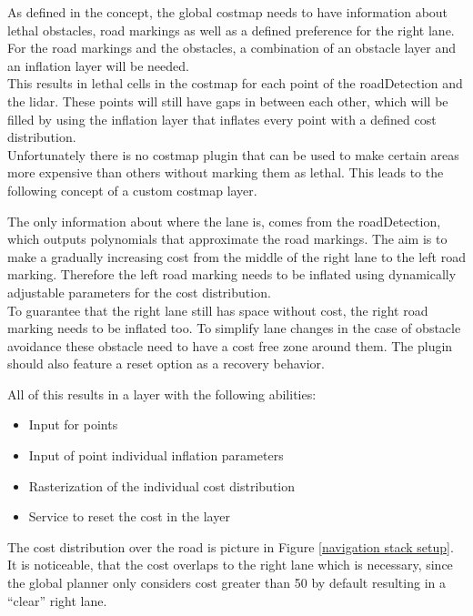 As defined in the concept, the global costmap needs to have information about lethal obstacles, road markings as well as a defined preference for the right lane.\\

For the road markings and the obstacles, a combination of an obstacle layer and an inflation layer will be needed.\\
This results in lethal cells in the costmap for each point of the roadDetection and the lidar. These points will still have gaps in between each other, which will be filled by using the inflation layer that inflates every point with a defined cost distribution.\\

Unfortunately there is no costmap plugin that can be used to make certain areas more expensive than others without marking them as lethal. This leads to the following concept of a custom costmap layer.

The only information about where the lane is, comes from the roadDetection, which outputs polynomials that approximate the road markings. The aim is to make a gradually increasing cost from the middle of the right lane to the left road marking. Therefore the left road marking needs to be inflated using dynamically adjustable parameters for the cost distribution.\\
To guarantee that the right lane still has space without cost, the right road marking needs to be inflated too. To simplify lane changes in the case of obstacle avoidance these obstacle need to have a cost free zone around them.
The plugin should also feature a reset option as a recovery behavior.

All of this results in a layer with the following abilities:

\begin{itemize}
	\item Input for points
	\item Input of point individual inflation parameters
	\item Rasterization of the individual cost distribution
	\item Service to reset the cost in the layer
\end{itemize}

The cost distribution over the road is picture in Figure \ref{navigation stack setup}. It is noticeable, that the  cost overlaps to the right lane which is necessary, since the global planner only considers cost greater than 50 by default resulting in a ``clear'' right lane.

